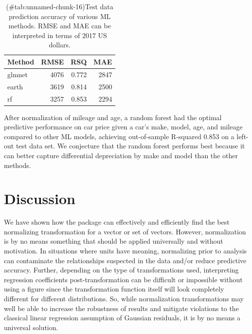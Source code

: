 \begin{Schunk}
\end{Schunk}

\begin{Schunk}
\begin{table}

\caption{(\#tab:unnamed-chunk-16)Test data prediction accuracy of various ML methods. RMSE and MAE can be interpreted in terms of 2017 US dollars.}
\centering
\begin{tabular}[t]{lrrr}
\toprule
Method & RMSE & RSQ & MAE\\
\midrule
glmnet & 4076 & 0.772 & 2847\\
earth & 3619 & 0.814 & 2500\\
rf & 3257 & 0.853 & 2294\\
\bottomrule
\end{tabular}
\end{table}

\end{Schunk}

After normalization of mileage and age, a random forest had the optimal
predictive performance on car price given a car's make, model, age, and
mileage compared to other ML models, achieving out-of-sample R-squared
0.853 on a left-out test data set. We conjecture that the random forest
performs best because it can better capture differential depreciation by
make and model than the other methods.

\hypertarget{discussion}{%
\section{Discussion}\label{discussion}}

We have shown how the  package can effectively and
efficiently find the best normalizing transformation for a vector or set
of vectors. However, normalization is by no means something that should
be applied universally and without motivation. In situations where units
have meaning, normalizing prior to analysis can contaminate the
relationships suspected in the data and/or reduce predictive accuracy.
Further, depending on the type of transformations used, interpreting
regression coefficients post-transformation can be difficult or
impossible without using a figure since the transformation function
itself will look completely different for different distributions. So,
while normalization transformations may well be able to increase the
robustness of results and mitigate violations to the classical linear
regression assumption of Gaussian residuals, it is by no means a
universal solution.

